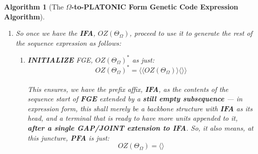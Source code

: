 \documentclass[a4paper, 18pt]{book} %
\newtheorem{alg}{Algorithm}
\begin{document}
\begin{alg}[The \textbf{$\Omega$-to-PLATONIC Form Genetic Code Expression Algorithm}]
\begin{enumerate}
{}
\item{ So once we have the \textbf{IFA}, $OZ(\Theta_\Omega)$, proceed to use it to generate the rest of the sequence expression as follows: 
\begin{enumerate}
\item {\textbf{INITIALIZE} FGE, $\boxed{OZ(\Theta_\Omega)}^*$ as just:\\

\begin{equation}
\label{EQSTARTFGE}
\boxed{OZ(\Theta_\Omega)}^* = \langle \langle OZ(\Theta_\Omega) \rangle \langle \rangle \rangle
\end{equation}\\

This ensures, we have the prefix affix, \textbf{IFA}, as the contents of the sequence start of \textbf{FGE} \textit{extended} by a \textbf{still empty subsequence} --- in expression form, this shall merely be a backbone structure with \textbf{IFA} as its head, and a terminal that is ready to have more units appended to it, \textbf{after a single GAP/JOINT extension to IFA}. So, it also means, at this juncture, \textbf{PFA} is just:\\

\begin{equation}
\label{EQSTARTFGESUF}
\boxed{OZ(\Theta_\Omega)} = \langle \rangle
\end{equation}\\

}
\end{enumerate}}
\end{enumerate}
\end{alg}
\end{document}
